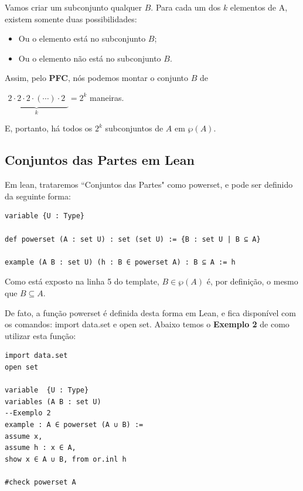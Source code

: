 Vamos criar um subconjunto qualquer $B$. Para cada um dos $k$ elementos de A, existem somente duas possibilidades:

\begin{itemize}

\item Ou o elemento está no subconjunto $B$;
    
\item Ou o elemento não está no subconjunto $B$.
  
\end{itemize}

Assim, pelo \textbf{PFC}, nós podemos montar o conjunto $B$ de
\begin{center}
    $\underbrace{\begin{matrix} 2\cdot2\cdot2\cdot(\cdots)\cdot2\end{matrix}}_{k} = 2^k$ maneiras.
\end{center}
E, portanto, há todos os $2^k$ subconjuntos de $A$ em $\wp(A)$.

\subsection{Conjuntos das Partes em Lean}
Em lean, trataremos ``Conjuntos das Partes" como {\selectfont powerset}, e pode ser definido da seguinte forma:
\begin{lstlisting}
variable {U : Type}

def powerset (A : set U) : set (set U) := {B : set U | B ⊆ A}

example (A B : set U) (h : B ∈ powerset A) : B ⊆ A := h \end{lstlisting}

Como está exposto na linha 5 do template, $B \in \wp(A)$ é, por definição, o mesmo que $B \subseteq A$.

De fato, a função {\selectfont powerset} é definida desta forma em Lean, e fica disponível com os comandos: {\selectfont import data.set} e {\selectfont open set}. Abaixo temos o \textbf{Exemplo 2} de como utilizar esta função:
\begin{lstlisting}
import data.set
open set

variable  {U : Type}
variables (A B : set U)
--Exemplo 2
example : A ∈ powerset (A ∪ B) :=
assume x,
assume h : x ∈ A,
show x ∈ A ∪ B, from or.inl h

#check powerset A \end{lstlisting}


